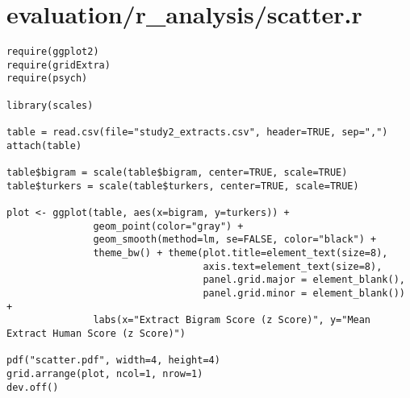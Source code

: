 \documentclass{article}
\begin{document}
\pagebreak

\section*{evaluation/r\_analysis/scatter.r}
\begin{verbatim}
require(ggplot2)
require(gridExtra)
require(psych)

library(scales)

table = read.csv(file="study2_extracts.csv", header=TRUE, sep=",")
attach(table)

table$bigram = scale(table$bigram, center=TRUE, scale=TRUE)
table$turkers = scale(table$turkers, center=TRUE, scale=TRUE)

plot <- ggplot(table, aes(x=bigram, y=turkers)) +
               geom_point(color="gray") +
               geom_smooth(method=lm, se=FALSE, color="black") +
               theme_bw() + theme(plot.title=element_text(size=8),
                                  axis.text=element_text(size=8),
                                  panel.grid.major = element_blank(),
                                  panel.grid.minor = element_blank()) +
               labs(x="Extract Bigram Score (z Score)", y="Mean Extract Human Score (z Score)")

pdf("scatter.pdf", width=4, height=4)
grid.arrange(plot, ncol=1, nrow=1)
dev.off()


\end{verbatim}
\pagebreak
\end{document}
